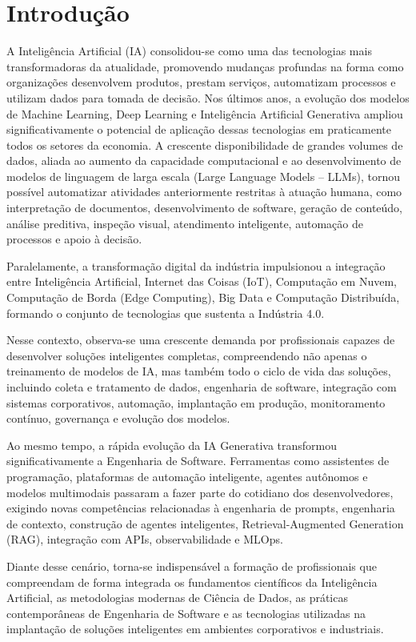 \chapter{Introdução}
\pagestyle{plain}

A Inteligência Artificial (IA) consolidou-se como uma das tecnologias mais transformadoras da atualidade, promovendo mudanças profundas na forma como organizações desenvolvem produtos, prestam serviços, automatizam processos e utilizam dados para tomada de decisão. Nos últimos anos, a evolução dos modelos de Machine Learning, Deep Learning e Inteligência Artificial Generativa ampliou significativamente o potencial de aplicação dessas tecnologias em praticamente todos os setores da economia.
A crescente disponibilidade de grandes volumes de dados, aliada ao aumento da capacidade computacional e ao desenvolvimento de modelos de linguagem de larga escala (Large Language Models – LLMs), tornou possível automatizar atividades anteriormente restritas à atuação humana, como interpretação de documentos, desenvolvimento de software, geração de conteúdo, análise preditiva, inspeção visual, atendimento inteligente, automação de processos e apoio à decisão.

Paralelamente, a transformação digital da indústria impulsionou a integração entre Inteligência Artificial, Internet das Coisas (IoT), Computação em Nuvem, Computação de Borda (Edge Computing), Big Data e Computação Distribuída, formando o conjunto de tecnologias que sustenta a Indústria 4.0.

Nesse contexto, observa-se uma crescente demanda por profissionais capazes de desenvolver soluções inteligentes completas, compreendendo não apenas o treinamento de modelos de IA, mas também todo o ciclo de vida das soluções, incluindo coleta e tratamento de dados, engenharia de software, integração com sistemas corporativos, automação, implantação em produção, monitoramento contínuo, governança e evolução dos modelos.

Ao mesmo tempo, a rápida evolução da IA Generativa transformou significativamente a Engenharia de Software. Ferramentas como assistentes de programação, plataformas de automação inteligente, agentes autônomos e modelos multimodais passaram a fazer parte do cotidiano dos desenvolvedores, exigindo novas competências relacionadas à engenharia de prompts, engenharia de contexto, construção de agentes inteligentes, Retrieval-Augmented Generation (RAG), integração com APIs, observabilidade e MLOps.

Diante desse cenário, torna-se indispensável a formação de profissionais que compreendam de forma integrada os fundamentos científicos da Inteligência Artificial, as metodologias modernas de Ciência de Dados, as práticas contemporâneas de Engenharia de Software e as tecnologias utilizadas na implantação de soluções inteligentes em ambientes corporativos e industriais.

